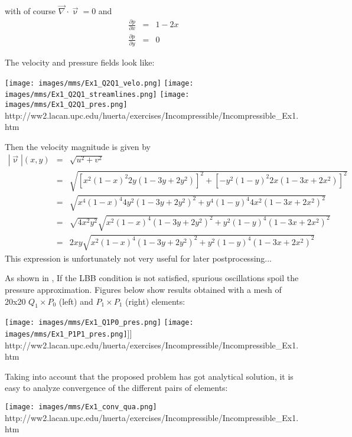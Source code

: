 with of course  ${\vec \nabla} \cdot {\vec \upnu} = 0$ and 
\begin{eqnarray}
\frac{\partial p}{\partial x} &=& 1-2x  \\
\frac{\partial p}{\partial y} &=& 0
\end{eqnarray}

The velocity and pressure fields look like:

\begin{center}
\texttt{[image: images/mms/Ex1\_Q2Q1\_velo.png]}
\texttt{[image: images/mms/Ex1\_Q2Q1\_streamlines.png]}
\texttt{[image: images/mms/Ex1\_Q2Q1\_pres.png]}\\
{\small http://ww2.lacan.upc.edu/huerta/exercises/Incompressible/Incompressible\_Ex1.htm}
\end{center}

Then the velocity magnitude is given by 
\begin{eqnarray}
|\vec\upnu|(x,y) 
&=& \sqrt{u^2+v^2} \\
&=& \sqrt{   
[x^2(1-x)^2 2y (1-3y+2y^2)]^2
+ [-y^2 (1 - y)^2 2x (1-3x+2x^2)]^2
} \\
&=& 
\sqrt{   
x^4(1-x)^4 4y^2 (1-3y+2y^2)^2
+ y^4 (1-y)^4 4x^2 (1-3x+2x^2)^2
} \\
&=& 
\sqrt{ 4x^2 y^2} 
\sqrt{   
x^2(1-x)^4 (1-3y+2y^2)^2
+ y^2 (1-y)^4 (1-3x+2x^2)^2
} \\
&=& 
2xy
\sqrt{   
x^2(1-x)^4 (1-3y+2y^2)^2
+ y^2 (1-y)^4 (1-3x+2x^2)^2
} \label{eq:dhvelnorm} 
\end{eqnarray}
This expression is unfortunately not very useful for later postprocessing...

\vspace{.5cm}


As shown in \cite{dohu03}, If the LBB condition is not satisfied, spurious oscillations spoil the pressure approximation. 
Figures below show results obtained with a mesh of 20x20 $Q_1\times P_0$ (left) and $P_1\times P_1$ (right) elements:
\begin{center}
\texttt{[image: images/mms/Ex1\_Q1P0\_pres.png]}
\texttt{[image: images/mms/Ex1\_P1P1\_pres.png]}]]
{\small http://ww2.lacan.upc.edu/huerta/exercises/Incompressible/Incompressible\_Ex1.htm}
\end{center}

Taking into account that the proposed problem has got analytical solution, it is easy to analyze convergence of the different pairs of elements:
\begin{center}
\texttt{[image: images/mms/Ex1\_conv\_qua.png]}\\
{\small http://ww2.lacan.upc.edu/huerta/exercises/Incompressible/Incompressible\_Ex1.htm}
\end{center}

